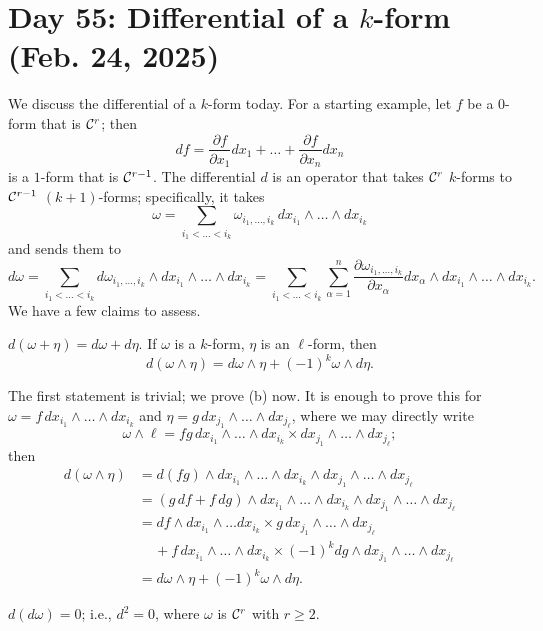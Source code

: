 \section{Day 55: Differential of a \texorpdfstring{$k$}{k}-form (Feb. 24, 2025)}
We discuss the differential of a $k$-form today. For a starting example, let $f$ be a $0$-form that is $\mathcal C^r$; then
\[ df = \frac{\partial f}{\partial x_1} dx_1 + \dots + \frac{\partial f}{\partial x_n} dx_n \]
is a $1$-form that is $\mathcal C^{r-1}$. The differential $d$ is an operator that takes $\mathcal C^r$ $k$-forms to $\mathcal C^{r-1}$ $(k+1)$-forms; specifically, it takes
\[ \omega = \sum_{i_1 < \dots < i_k} \omega_{i_1, \dots, i_k} \, dx_{i_1} \wedge \dots \wedge dx_{i_k} \]
and sends them to
\[ d\omega = \sum_{i_1 < \dots < i_k} d\omega_{i_1, \dots, i_k} \wedge dx_{i_1} \wedge \dots \wedge dx_{i_k} = \sum_{i_1 < \dots < i_k} \sum_{\alpha = 1}^n \frac{\partial \omega_{i_1, \dots, i_k}}{\partial x_\alpha} dx_{\alpha} \wedge dx_{i_1} \wedge \dots \wedge dx_{i_k}. \]
We have a few claims to assess.
\begin{simplethm}
    $d(\omega + \eta) = d\omega + d\eta$. If $\omega$ is a $k$-form, $\eta$ is an $\ell$-form, then
    \[ d(\omega \wedge \eta) = d\omega \wedge \eta + (-1)^k \omega \wedge d\eta. \]
\end{simplethm}
\noindent The first statement is trivial; we prove (b) now. It is enough to prove this for $\omega = f \, dx_{i_1} \wedge \dots \wedge dx_{i_k}$ and $\eta = g \, dx_{j_1} \wedge \dots \wedge dx_{j_\ell}$, where we may directly write
\[ \omega \wedge \ell = fg \, dx_{i_1} \wedge \dots \wedge dx_{i_k} \times dx_{j_1} \wedge \dots \wedge dx_{j_\ell}; \]
then
\begin{align*}
    d(\omega \wedge \eta) &= d(fg) \wedge dx_{i_1} \wedge \dots \wedge dx_{i_k} \wedge dx_{j_1} \wedge \dots \wedge dx_{j_\ell} \\
    &= (g \, df + f \, dg) \wedge dx_{i_1} \wedge \dots \wedge dx_{i_k} \wedge dx_{j_1} \wedge \dots \wedge dx_{j_\ell} \\
    &= df \wedge dx_{i_1} \wedge \dots dx_{i_k} \times g \, dx_{j_1} \wedge \dots \wedge dx_{j_\ell} \\
    & \,\,\,\,\,\,\, + f \, dx_{i_1} \wedge \dots \wedge dx_{i_k} \times (-1)^k dg \wedge dx_{j_1} \wedge \dots \wedge dx_{j_\ell} \\
    &= d\omega \wedge \eta + (-1)^k \omega \wedge d\eta.
\end{align*}
\begin{simplethm}
    $d(d \omega) = 0$; i.e., $d^2 = 0$, where $\omega$ is $\mathcal C^r$ with $r \geq 2$.
\end{simplethm}
